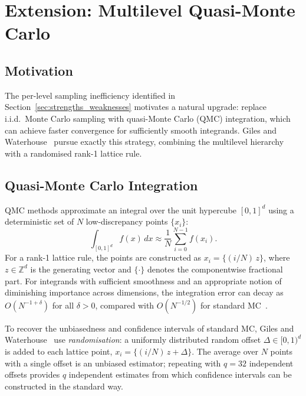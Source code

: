 \documentclass[11pt]{article}
\begin{document}
\section{Extension: Multilevel Quasi-Monte Carlo}\label{sec:qmc}

\subsection{Motivation}

The per-level sampling inefficiency identified in Section~\ref{sec:strengths_weaknesses} motivates a natural upgrade: replace i.i.d.\ Monte Carlo sampling with quasi-Monte Carlo (QMC) integration, which can achieve faster convergence for sufficiently smooth integrands. Giles and Waterhouse~\cite{giles2009} pursue exactly this strategy, combining the multilevel hierarchy with a randomised rank-1 lattice rule.

\subsection{Quasi-Monte Carlo Integration}

QMC methods approximate an integral over the unit hypercube $[0,1]^{d}$ using a deterministic set of $N$ low-discrepancy points $\{x_{i}\}$:
\begin{equation}
\int_{[0,1]^{d}} f(x)\,dx \approx \frac{1}{N}\sum_{i=0}^{N-1}f(x_{i}).
\label{eq:qmc}
\end{equation}
For a rank-1 lattice rule, the points are constructed as $x_{i} = \{(i/N)\,z\}$, where $z \in \mathbb{Z}^{d}$ is the generating vector and $\{\cdot\}$ denotes the componentwise fractional part. For integrands with sufficient smoothness and an appropriate notion of diminishing importance across dimensions, the integration error can decay as $O(N^{-1+\delta})$ for all $\delta > 0$, compared with $O(N^{-1/2})$ for standard MC~\cite{sloan2004}.

To recover the unbiasedness and confidence intervals of standard MC, Giles and Waterhouse~\cite{giles2009} use \emph{randomisation}: a uniformly distributed random offset $\Delta \in [0,1)^{d}$ is added to each lattice point, $x_{i} = \{(i/N)\,z + \Delta\}$. The average over $N$ points with a single offset is an unbiased estimator; repeating with $q = 32$ independent offsets provides $q$ independent estimates from which confidence intervals can be constructed in the standard way.
\end{document}
